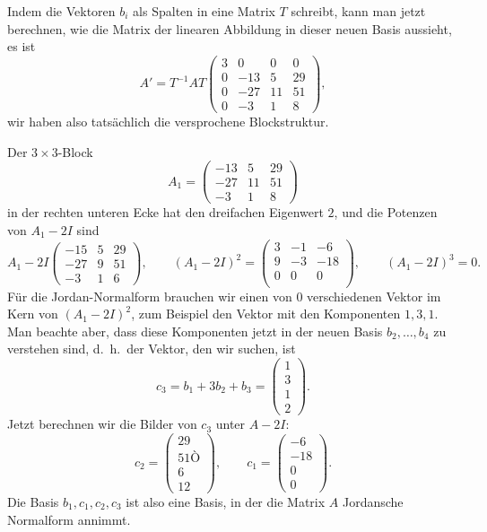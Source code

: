 \begin{loesung}
Indem die Vektoren $b_i$ als Spalten in eine Matrix $T$ schreibt, kann man
jetzt berechnen, wie die Matrix der linearen Abbildung in dieser neuen
Basis aussieht, es ist
\[
A'=T^{-1}AT
\left(
\begin{array}{r|rrr}
    3&   0&   0&   0\\
\hline
    0& -13&   5&  29\\
    0& -27&  11&  51\\
    0&  -3&   1&   8
\end{array}
\right),
\]
wir haben also tatsächlich die versprochene Blockstruktur.

Der $3\times 3$-Block
\[
A_1
=
\begin{pmatrix}
 -13&   5&  29\\
 -27&  11&  51\\
  -3&   1&   8
\end{pmatrix}
\]
in der rechten unteren Ecke hat den dreifachen Eigenwert $2$, 
und die Potenzen von $A_1-2I$ sind
\[
A_1-2I
\begin{pmatrix}
  -15 &  5&  29\\
  -27 &  9&  51\\
   -3 &  1&   6
\end{pmatrix}
,\qquad
(A_1-2I)^2
=
\begin{pmatrix}
    3 & -1 & -6\\
    9 & -3 &-18\\
    0 &  0 &  0\\
\end{pmatrix}
,\qquad
(A_1-2I)^3=0.
\]
Für die Jordan-Normalform brauchen wir einen von $0$ verschiedenen
Vektor im Kern von $(A_1-2I)^2$, zum Beispiel den Vektor mit den
Komponenten $1,3,1$.
Man beachte aber, dass diese Komponenten jetzt in der neuen Basis
$b_2,\dots,b_4$ zu verstehen sind, d.~h.~der Vektor, den wir suchen, ist
\[
c_3
=
b_1+ 3b_2+b_3
=
\begin{pmatrix}1\\3\\1\\2\end{pmatrix}.
\]
Jetzt berechnen wir die Bilder von $c_3$ unter $A-2I$:
\[
c_2
=
\begin{pmatrix}
29\\51Ò\\6\\12
\end{pmatrix}
,\qquad
c_1
=
\begin{pmatrix}
-6\\-18\\0\\0
\end{pmatrix}.
\]
Die Basis $b_1,c_1,c_2,c_3$ ist also eine Basis, in der die Matrix $A$
Jordansche Normalform annimmt.


\end{loesung}
